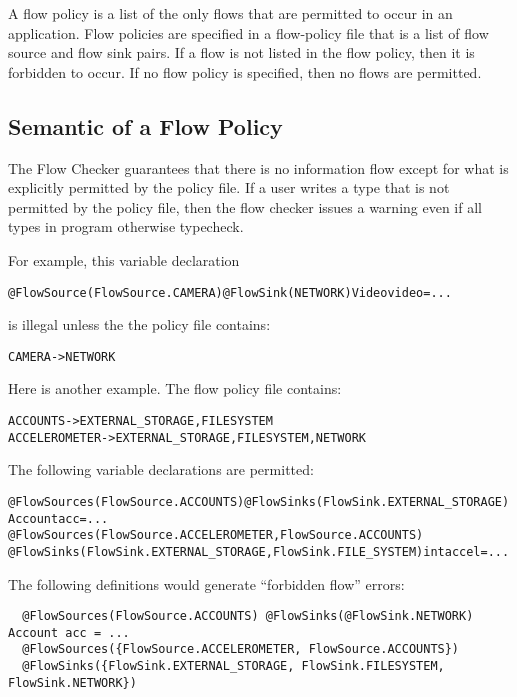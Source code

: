 A flow policy is a list of the only flows that are permitted to occur in an application.
Flow policies are specified in a flow-policy file that is  a list 
 of flow source and flow sink pairs.  If a flow is not listed in the flow policy, then 
 it is forbidden to occur.  If no flow policy is specified, then no flows are permitted. 
 
\subsection{Semantic of a Flow Policy}
\label{sec:undsiredflows}
The Flow Checker guarantees that there is no information
flow except for what is explicitly permitted by the policy file. If a user writes a type that is
not permitted by the policy file, then the flow checker issues a warning
even if all types in program otherwise typecheck.

For example, this variable declaration

\begin{alltt}
@FlowSource(FlowSource.CAMERA) @FlowSink(NETWORK) Video video = ...
\end{alltt}

\noindent
is illegal unless the the policy file contains:

\begin{alltt}
CAMERA -> NETWORK
\end{alltt}

Here is another example.
The flow policy file contains:
\begin{alltt}
  ACCOUNTS      -> EXTERNAL_STORAGE, FILESYSTEM
  ACCELEROMETER -> EXTERNAL_STORAGE, FILESYSTEM, NETWORK
\end{alltt}

The following variable declarations are permitted:
\begin{alltt}
  @FlowSources(FlowSource.ACCOUNTS) @FlowSinks(FlowSink.EXTERNAL_STORAGE) Account acc = ...
  @FlowSources({FlowSource.ACCELEROMETER, FlowSource.ACCOUNTS})
  @FlowSinks({FlowSink.EXTERNAL_STORAGE, FlowSink.FILE_SYSTEM}) int accel = ...
\end{alltt}

The following definitions would generate ``forbidden flow'' errors:
\begin{Verbatim}
  @FlowSources(FlowSource.ACCOUNTS) @FlowSinks(@FlowSink.NETWORK) Account acc = ...
  @FlowSources({FlowSource.ACCELEROMETER, FlowSource.ACCOUNTS})
  @FlowSinks({FlowSink.EXTERNAL_STORAGE, FlowSink.FILESYSTEM, FlowSink.NETWORK})
\end{Verbatim}

